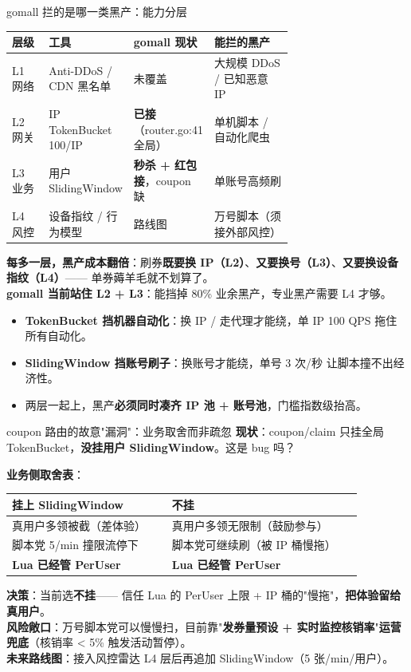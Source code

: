 \documentclass[aspectratio=169,11pt]{beamer}
\begin{document}
\begin{frame}[shrink]{gomall 拦的是哪一类黑产：能力分层}
\scriptsize
\begin{tabular}{@{}lp{0.20\linewidth}p{0.22\linewidth}p{0.28\linewidth}@{}}
\toprule
层级 & 工具 & gomall 现状 & 能拦的黑产 \\
\midrule
L1 网络   & Anti-DDoS / CDN 黑名单 & 未覆盖 & 大规模 DDoS / 已知恶意 IP \\
L2 网关   & IP TokenBucket 100/IP & \textbf{已接}（router.go:41 全局） & 单机脚本 / 自动化爬虫 \\
L3 业务   & 用户 SlidingWindow    & \textbf{秒杀 + 红包接}，coupon 缺 & 单账号高频刷 \\
L4 风控   & 设备指纹 / 行为模型   & 路线图 & 万号脚本（须接外部风控） \\
\bottomrule
\end{tabular}
\vspace{2mm}

\textbf{每多一层，黑产成本翻倍}：刷券\textbf{既要换 IP（L2）}、\textbf{又要换号（L3）}、\textbf{又要换设备指纹（L4）}—— 单券薅羊毛就不划算了。\\
\textbf{gomall 当前站住 L2 + L3}：能挡掉 80\% 业余黑产，专业黑产需要 L4 才够。
\vspace{2mm}
\begin{itemize}\itemsep0pt
  \item \textbf{TokenBucket 挡机器自动化}：换 IP / 走代理才能绕，单 IP 100 QPS 拖住所有自动化。
  \item \textbf{SlidingWindow 挡账号刷子}：换账号才能绕，单号 3 次/秒 让脚本撞不出经济性。
  \item 两层一起上，黑产\textbf{必须同时凑齐 IP 池 + 账号池}，门槛指数级抬高。
\end{itemize}
\end{frame}

\begin{frame}[shrink]{coupon 路由的故意"漏洞"：业务取舍而非疏忽}
\textbf{现状}：coupon/claim 只挂全局 TokenBucket，\textbf{没挂用户 SlidingWindow}。这是 bug 吗？

\vspace{2mm}
\textbf{业务侧取舍表}：
\begin{tabular}{@{}p{0.42\linewidth}p{0.5\linewidth}@{}}
\toprule
挂上 SlidingWindow & 不挂 \\
\midrule
真用户多领被截（差体验）& 真用户多领无限制（鼓励参与）\\
脚本党 5/min 撞限流停下 & 脚本党可继续刷（被 IP 桶慢拖） \\
\textbf{Lua 已经管 PerUser} & \textbf{Lua 已经管 PerUser} \\
\bottomrule
\end{tabular}
\vspace{2mm}

\small \textbf{决策}：当前选\textbf{不挂}—— 信任 Lua 的 PerUser 上限 + IP 桶的"慢拖"，\textbf{把体验留给真用户}。\\
\textbf{风险敞口}：万号脚本党可以慢慢扫，目前靠"\textbf{发券量预设 + 实时监控核销率}"\textbf{运营兜底}（核销率 < 5\% 触发活动暂停）。\\
\textbf{未来路线图}：接入风控雷达 L4 层后再追加 SlidingWindow（5 张/min/用户）。
\end{frame}
\end{document}
